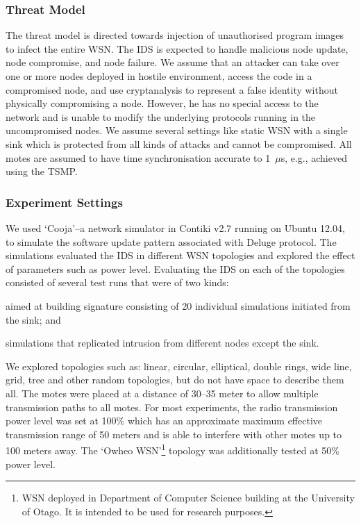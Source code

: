 \documentclass{CRPITStyle}
\renewcommand{\cite}{\citep}
\begin{document}
\subsubsection*{Threat Model}
The threat model is directed towards injection of unauthorised program images to infect the entire WSN.
The IDS is expected to handle malicious node update, node compromise, and node failure.
We assume that an  attacker  can take over one or more nodes deployed in hostile environment, access the code in a compromised node, and use cryptanalysis to represent a false identity without physically compromising a node.
However, he has  no special  access to  the  network and is unable to modify the underlying protocols running in the uncompromised nodes.
We assume several settings like static WSN with a single  sink which is  protected from all kinds of attacks and cannot be compromised. All motes are assumed to have time synchronisation accurate to 1~$\mu$s, e.g., achieved using the TSMP. %
\subsubsection*{Experiment Settings}
\label{subsec:sim_env} 
We used `Cooja'--a %
 network simulator in Contiki v2.7 running on Ubuntu 12.04, to simulate the software update pattern associated with Deluge protocol.
The simulations evaluated the IDS in different WSN topologies and explored the effect of parameters such as power level.
Evaluating the IDS on each of the topologies consisted of several test runs that  were of two kinds: 
\begin{inparaenum}
\item aimed at building signature consisting of 20 individual simulations initiated from the sink; and
\item simulations that replicated intrusion from different nodes except the sink.
\end{inparaenum}
We explored topologies such as: linear, circular, elliptical, double rings, wide line, grid, tree and other random topologies, but do not have space to describe them all.
The motes were placed at a distance of 30--35 meter to allow  multiple transmission paths to all motes. 
For most experiments, the radio transmission power level was set at 100\% which has an approximate maximum effective transmission range of 50 meters and is able to interfere with other motes up to 100 meters away.
The `Owheo WSN'\footnote{WSN deployed in Department of Computer Science building at the University of Otago. It is intended to be used for research purposes.} topology was additionally tested at 50\% power level.%
\end{document}
